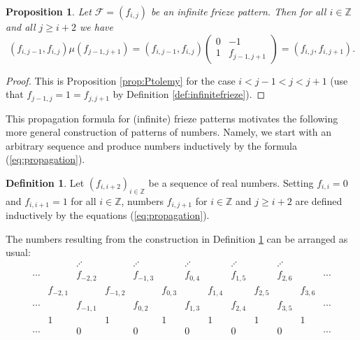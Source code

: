 \documentclass[11pt,a4paper]{amsart}
\newtheorem{Proposition}[Lemma]{Proposition}
\theoremstyle{definition}
\newtheorem{Definition}[Lemma]{Definition}
\numberwithin{equation}{section}
\begin{document}
\begin{Proposition}
Let $\mathcal{F}=(f_{i,j})$ be an infinite frieze pattern. Then for all $i\in \mathbb{Z}$ and all $j\ge i+2$ we have
\begin{equation} \label{eq:propagation}
(f_{i,j-1},f_{i,j}) \mu(f_{j-1,j+1}) =
(f_{i,j-1},f_{i,j}) \begin{pmatrix} 0 & -1 \\ 1 & f_{j-1,j+1} \end{pmatrix}
= (f_{i,j},f_{i,j+1}).
\end{equation}
\end{Proposition}

\begin{proof} 
This is Proposition \ref{prop:Ptolemy} 
for the case $i<j-1<j<j+1$ (use that 
$f_{j-1,j}=1=f_{j,j+1}$ by Definition 
\ref{def:infinitefrieze}).
\end{proof}

This propagation formula for (infinite) frieze 
patterns motivates the following 
more general construction of patterns of numbers.
Namely, we start with an arbitrary sequence
and produce numbers inductively by the formula
(\ref{eq:propagation}). 

\begin{Definition} \label{def:halfpattern}
Let 
$(f_{i,i+2})_{i\in \mathbb{Z}}$ be a sequence
of real numbers. Setting $f_{i,i}=0$ and 
$f_{i,i+1}=1$ for all $i\in \mathbb{Z}$, 
numbers $f_{i,j+1}$ for $i\in \mathbb{Z}$ and
$j\ge i+2$ are defined inductively by the equations
(\ref{eq:propagation}).
\end{Definition}

The numbers resulting from the construction 
in Definition \ref{def:halfpattern} can be 
arranged as usual:
$$\begin{array}{ccccccccccccc}
& & \iddots & & \iddots & & \iddots & & \iddots & & \iddots & & \\
\cdots &  & f_{-2,2} & & f_{-1,3} & & f_{0,4} & & f_{1,5} & & f_{2,6} & & \cdots \\
& f_{-2,1}& & f_{-1,2} & & f_{0,3} & & f_{1,4} & & f_{2,5} & &f_{3,6} &  \\
\cdots & & f_{-1,1} & & f_{0,2} & & f_{1,3} & & f_{2,4} & & f_{3,5} &  & \cdots \\
  & 1 & & 1 & & 1 & & 1 & & 1 & & 1 & \\
  \cdots  &  & 0 &  & 0 &  & 0 &  & 0 &  & 0 & & \cdots \\
 \end{array}
$$
\end{document}

